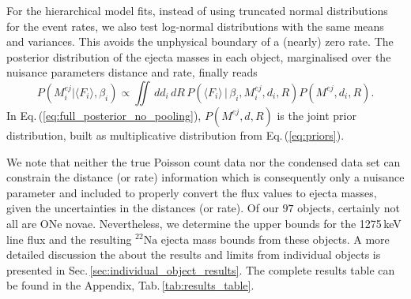 \documentclass{aa}
\newcommand{\mrm}[1]{\mathrm{#1}}
\newcommand{\nuc}[2]{$\mrm{^{#2}#1}$}
\begin{document}
%
For the hierarchical model fits, instead of using truncated normal distributions for the event rates, we also test log-normal distributions with the same means and variances.
%
This avoids the unphysical boundary of a (nearly) zero rate.
%
The posterior distribution of the ejecta masses in each object, marginalised over the nuisance parameters distance and rate, finally reads
%
\begin{equation}
	P(M_i^{ej} | \langle F_i \rangle, \beta_i) \propto \iint \, dd_i \, dR \, P(\langle F_i \rangle\, | \,\beta_i, M_i^{ej}, d_i, R) P(M^{ej}, d_i, R)\mrm{.}
	\label{eq:full_posterior_no_pooling}
\end{equation}
%
In Eq.\,(\ref{eq:full_posterior_no_pooling}), $P(M^{ej}, d, R)$ is the joint prior distribution, built as multiplicative distribution from Eq.\,(\ref{eq:priors}).

We note that neither the true Poisson count data nor the condensed data set can constrain the distance (or rate) information which is consequently only a nuisance parameter and included to properly convert the flux values to ejecta masses, given the uncertainties in the distances (or rate).
%
Of our $97$ objects, certainly not all are ONe novae.
%
Nevertheless, we determine the upper bounds for the 1275\,keV line flux and the resulting \nuc{Na}{22} ejecta mass bounds from these objects.
%
A more detailed discussion the about the results and limits from individual objects is presented in Sec.\,\ref{sec:individual_object_results}.
%
The complete results table can be found in the Appendix, Tab.\,\ref{tab:results_table}.
\end{document}
